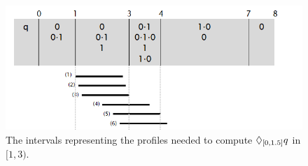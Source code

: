 \begin{figure}
	\centering
	\includegraphics[scale=0.5]{profiles.png}
	\caption{The intervals representing the profiles needed to compute $\lozenge_{[0,1.5]} q$ in $[1,3)$. \label{fig:profiles}}
\end{figure}